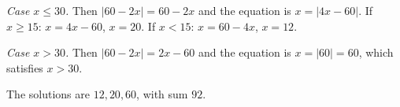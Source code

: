 \emph{Case $x\le30$.} Then $|60-2x|=60-2x$ and the equation is $x=|4x-60|$. If $x\ge15$: $x=4x-60$, $x=20$. If $x<15$: $x=60-4x$, $x=12$.

\emph{Case $x>30$.} Then $|60-2x|=2x-60$ and the equation is $x=|60|=60$, which satisfies $x>30$.

The solutions are $12,20,60$, with sum $\boxed{92}$.
